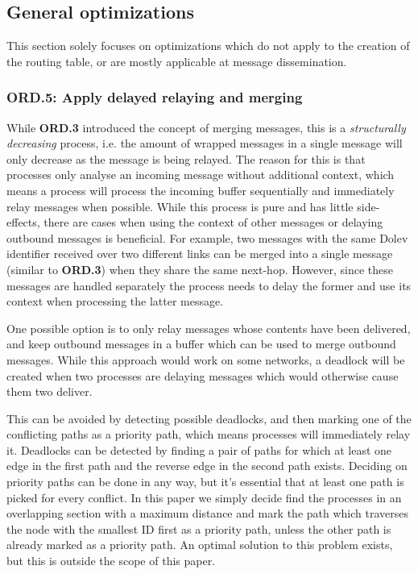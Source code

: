 \subsection{General optimizations}
This section solely focuses on optimizations which do not apply to the creation of the routing table, or are mostly applicable at message dissemination. 

\subsubsection{ORD.5: Apply delayed relaying and merging}
While \textbf{ORD.3} introduced the concept of merging messages, this is a \textit{structurally decreasing} process, i.e. the amount of wrapped messages in a single message will only decrease as the message is being relayed. The reason for this is that processes only analyse an incoming message without additional context, which means a process will process the incoming buffer sequentially and immediately relay messages when possible.
While this process is pure and has little side-effects, there are cases when using the context of other messages or delaying outbound messages is beneficial. For example, two messages with the same Dolev identifier received over two different links can be merged into a single message (similar to \textbf{ORD.3}) when they share the same next-hop. However, since these messages are handled separately the process needs to delay the former and use its context when processing the latter message.

One possible option is to only relay messages whose contents have been delivered, and keep outbound messages in a buffer which can be used to merge outbound messages. While this approach would work on some networks, a deadlock will be created when two processes are delaying messages which would otherwise cause them two deliver.

This can be avoided by detecting possible deadlocks, and then marking one of the conflicting paths as a priority path, which means processes will immediately relay it. Deadlocks can be detected by finding a pair of paths for which at least one edge in the first path and the reverse edge in the second path exists. Deciding on priority paths can be done in any way, but it's essential that at least one path is picked for every conflict. In this paper we simply decide find the processes in an overlapping section with a maximum distance and mark the path which traverses the node with the smallest ID first as a priority path, unless the other path is already marked as a priority path. An optimal solution to this problem exists, but this is outside the scope of this paper.

